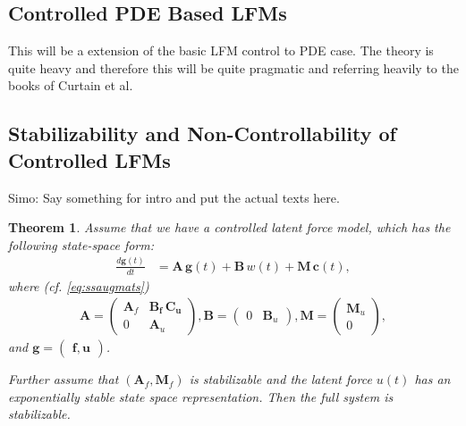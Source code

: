 \documentclass[journal]{IEEEtran}
\newtheorem{theorem}{Theorem}[section]
\newcommand{\simo}[1]{{\color{red}#1}}
\begin{document}
\subsection{Controlled PDE Based LFMs}
%
\simo{This will be a extension of the basic LFM control to PDE case. The theory is quite heavy and therefore this will be quite pragmatic and referring heavily to the books of Curtain et al.}

\subsection{Stabilizability and Non-Controllability of Controlled LFMs}
%
\simo{Simo: Say something for intro and put the actual texts here.}

\begin{theorem} \label{the:stab}
Assume that we have a controlled latent force model, which has the following state-space form:
%
\begin{equation}
\begin{split}
  \frac{d\mathbf{g}(t)}{dt}
  &= \mathbf{A} \, \mathbf{g}(t)
  + \mathbf{B} \, w(t) + \mathbf{M} \, \mathbf{c}(t),
\end{split}
\end{equation}
%
where (cf. \eqref{eq:ssaugmats})
%
\begin{equation}
\begin{split}
  \mathbf{A}
  = \begin{pmatrix}
	\mathbf{A}_f & \mathbf{\mathbf{B}_f \, \mathbf{C}_u} \\
	0 & \mathbf{A}_u
  \end{pmatrix}, 
  \mathbf{B}
  = \begin{pmatrix}
	0 & \mathbf{B}_u
  \end{pmatrix}, 
  \mathbf{M} = \begin{pmatrix} \mathbf{M}_u \\ 0 \end{pmatrix},
\end{split}
\end{equation}
%
and $\mathbf{g} = \begin{pmatrix} \mathbf{f}, \mathbf{u} \end{pmatrix}$.

Further assume that $(\mathbf{A}_f,\mathbf{M}_f)$ is stabilizable and the latent force $u(t)$ has an exponentially stable state space representation. Then the full system is \emph{stabilizable}.
\end{theorem}
\end{document}
